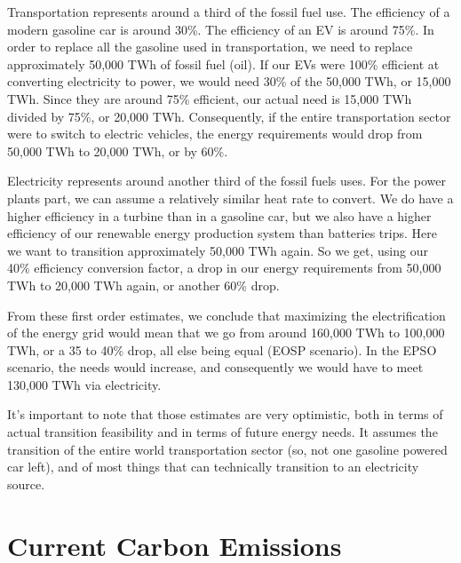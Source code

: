 Transportation represents around a third of the fossil fuel use. The efficiency of a modern gasoline car is around 30\%. The efficiency of an EV is around 75\%. In order to replace all the gasoline used in transportation, we need to replace approximately 50,000 TWh of fossil fuel (oil). If our EVs were 100\% efficient at converting electricity to power, we would need 30\% of the 50,000 TWh, or 15,000 TWh. Since they are around 75\% efficient, our actual need is 15,000 TWh divided by 75\%, or 20,000 TWh. Consequently, if the entire transportation sector were to switch to electric vehicles, the energy requirements would drop from 50,000 TWh to 20,000 TWh, or by 60\%.

Electricity represents around another third of the fossil fuels uses. For the power plants part, we can assume a relatively similar heat rate to convert. We do have a higher efficiency in a turbine than in a gasoline car, but we also have a higher efficiency of our renewable energy production system than batteries trips. Here we want to transition approximately 50,000 TWh again. So we get, using our 40\% efficiency conversion factor, a drop in our energy requirements from 50,000 TWh to 20,000 TWh again, or another 60\% drop.


From these first order estimates, we conclude that maximizing the electrification of the energy grid would mean that we go from around 160,000 TWh to 100,000 TWh, or a 35 to 40\% drop, all else being equal (EOSP scenario). In the EPSO scenario, the needs would increase, and consequently we would have to meet 130,000 TWh via electricity.


It's important to note that those estimates are very optimistic, both in terms of actual transition feasibility and in terms of future energy needs. It assumes the transition of the entire world transportation sector (so, not one gasoline powered car left), and of most things that can technically transition to an electricity source.


\section{Current Carbon Emissions}

